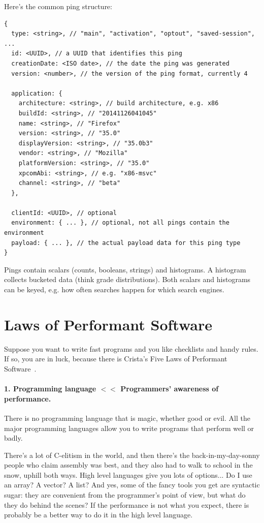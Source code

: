 \documentclass[a4paper]{report}
\begin{document}
Here's the common ping structure:

{\scriptsize
\begin{verbatim}
{
  type: <string>, // "main", "activation", "optout", "saved-session", ...
  id: <UUID>, // a UUID that identifies this ping
  creationDate: <ISO date>, // the date the ping was generated
  version: <number>, // the version of the ping format, currently 4

  application: {
    architecture: <string>, // build architecture, e.g. x86
    buildId: <string>, // "20141126041045"
    name: <string>, // "Firefox"
    version: <string>, // "35.0"
    displayVersion: <string>, // "35.0b3"
    vendor: <string>, // "Mozilla"
    platformVersion: <string>, // "35.0"
    xpcomAbi: <string>, // e.g. "x86-msvc"
    channel: <string>, // "beta"
  },

  clientId: <UUID>, // optional
  environment: { ... }, // optional, not all pings contain the environment
  payload: { ... }, // the actual payload data for this ping type
}
\end{verbatim}
}

Pings contain scalars (counts, booleans, strings) and histograms. A histogram collects
bucketed data (think grade distributions). Both scalars and histograms can be keyed, e.g.
how often searches happen for which search engines.

\section*{Laws of Performant Software}

Suppose you want to write fast programs and you like checklists and handy rules. If so, you are in luck, because there is Crista's Five Laws of Performant Software~\cite{lpsw}. 

\paragraph{1. Programming language $<<$ Programmers' awareness of performance.}
There is no programming language that is magic, whether good or evil. All the major programming languages allow you to write programs that perform well or badly. 

There's a lot of C-elitism in the world, and then there's the back-in-my-day-sonny people who claim assembly was best, and they also had to walk to school in the snow, uphill both ways.  High level languages give you lots of options... Do I use an array? A vector? A list? And yes, some of the fancy tools you get are syntactic sugar: they are convenient from the programmer's point of view, but what do they do behind the scenes? If the performance is not what you expect, there is probably be a better way to do it in the high level language.
\end{document}
